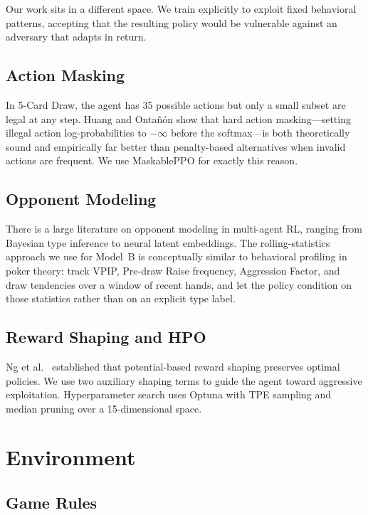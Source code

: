 \documentclass[11pt, conference]{IEEEtran}
\begin{document}
Our work sits in a different space. We train explicitly to exploit
fixed behavioral patterns, accepting that the resulting policy would
be vulnerable against an adversary that adapts in return.

\subsection{Action Masking}

In 5-Card Draw, the agent has 35 possible actions but only a small
subset are legal at any step. Huang and Onta\~{n}{\'o}n
\cite{huang2022closer} show that hard action masking---setting illegal
action log-probabilities to $-\infty$ before the softmax---is both
theoretically sound and empirically far better than penalty-based
alternatives when invalid actions are frequent. We use MaskablePPO
\cite{raffin2021stable} for exactly this reason.

\subsection{Opponent Modeling}

There is a large literature on opponent modeling in multi-agent RL,
ranging from Bayesian type inference to neural latent embeddings.
The rolling-statistics approach we use for Model~B is conceptually
similar to behavioral profiling in poker theory: track VPIP,
Pre-draw Raise frequency, Aggression Factor, and draw tendencies over
a window of recent hands, and let the policy condition on those
statistics rather than on an explicit type label.

\subsection{Reward Shaping and HPO}

Ng et al.~\cite{ng1999policy} established that potential-based reward
shaping preserves optimal policies. We use two auxiliary shaping terms
to guide the agent toward aggressive exploitation. Hyperparameter
search uses Optuna \cite{akiba2019optuna} with TPE sampling and
median pruning over a 15-dimensional space.

\section{Environment}
\label{sec:env}

\subsection{Game Rules}
\end{document}
